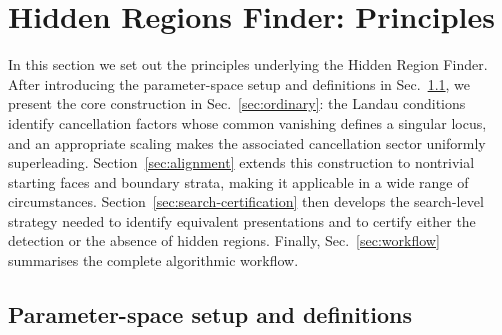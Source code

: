 \documentclass[a4paper,11pt]{article}
\begin{document}
\section{Hidden Regions Finder: Principles}
\label{sec:principles}

In this section we set out the principles underlying the Hidden Region
Finder.  After introducing the parameter-space setup and definitions in
Sec.~\ref{sec:notation}, we present the core construction in
Sec.~\ref{sec:ordinary}: the Landau conditions identify cancellation factors
whose common vanishing defines a singular locus, and an appropriate scaling
makes the associated cancellation sector uniformly superleading.
Section~\ref{sec:alignment} extends this construction to nontrivial starting
faces and boundary strata, making it applicable in a wide range of
circumstances.  Section~\ref{sec:search-certification} then develops the search-level
strategy needed to identify equivalent presentations and to certify either
the detection or the absence of hidden regions.  Finally,
Sec.~\ref{sec:workflow} summarises the complete algorithmic workflow.

\subsection{Parameter-space setup and definitions}
\label{sec:notation}
\end{document}
